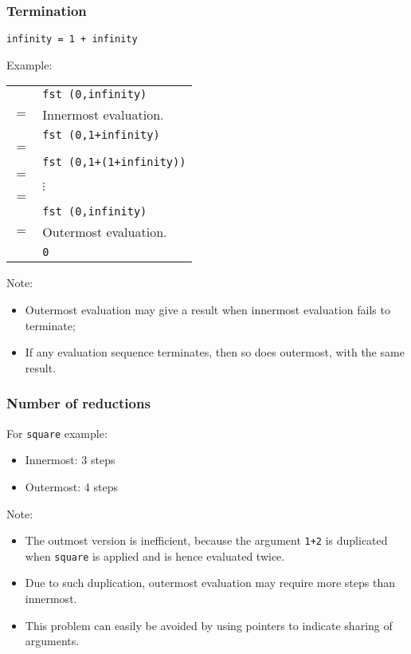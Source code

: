\begin{multicols}{2}
\subsubsection{Termination}
\begin{lstlisting}
infinity = 1 + infinity
\end{lstlisting}

Example:\\
\begin{tabularx}{\linewidth}{lX}
  & \lstinline{fst (0,infinity)}\\
  \(=\) & \tiny{Innermost evaluation.}\\
  & \lstinline{fst (0,1+infinity)}\\
  \(=\) & \\
  & \lstinline{fst (0,1+(1+infinity))}\\
  \(=\) & \\
  & \(\vdots\)\\
  \(=\) & \\
  & \lstinline{fst (0,infinity)}\\
  \(=\) & \tiny{Outermost evaluation.}\\
  & \lstinline{0}\\
\end{tabularx}

Note:
\begin{itemize}
  \item Outermost evaluation may give a result when innermost evaluation fails to terminate;
  \item If any evaluation sequence terminates, then so does outermost, with the same result.
\end{itemize}

\subsubsection{Number of reductions}
For \lstinline{square} example:
\begin{itemize}
  \item Innermost: 3 steps
  \item Outermost: 4 steps
\end{itemize}

Note:
\begin{itemize}
  \item The outmost version is inefficient, because the argument \lstinline{1+2} is duplicated when \lstinline{square} is applied and is hence evaluated twice.
  \item Due to such duplication, outermost evaluation may require more steps than innermost.
  \item This problem can easily be avoided by using pointers to indicate sharing of arguments.
\end{itemize}


\end{multicols}
